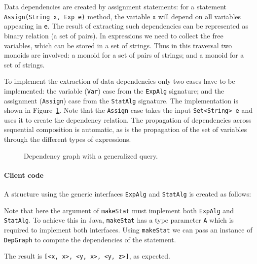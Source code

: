 
Data dependencies are created by assignment statements: for a
statement \lstinline{Assign(String x, Exp e)} method, the variable
\lstinline{x} will depend on all variables appearing in \lstinline{e}.
The result of extracting such dependencies can be represented as
binary relation (a set of pairs). In expressions we need to collect
the free variables, which can be stored in a set of strings.  Thus in
this traversal two monoids are involved: a monoid for a set of pairs
of strings; and a monoid for a set of strings.

To implement the extraction of data dependencies only two cases have to
be implemented: the variable (\lstinline{Var}) case from the
\lstinline{ExpAlg} signature; and the assignment (\lstinline{Assign})
case from the \lstinline{StatAlg} signature.  The implementation is
shown in Figure~\ref{deps2}.  Note that the \lstinline{Assign} case takes
the input \lstinline{Set<String> e} and uses it to create the
dependency relation.  The propagation of dependencies across
sequential composition is automatic, as is the propagation of the set
of variables through the different types of expressions.


\begin{figure}[t]
\nocaptionrule
\caption{Dependency graph with a generalized query.}
\label{deps2}
\end{figure}

\paragraph{Client code} A structure using the generic interfaces
\lstinline{ExpAlg} and \lstinline{StatAlg} is created as follows:


\noindent Note that here the argument of
\lstinline{makeStat} must
implement both \lstinline{ExpAlg} and \lstinline{StatAlg}. To achieve
this in Java, {\small\texttt{makeStat}} has a type parameter \lstinline{A}
which is required to implement both interfaces. Using
\lstinline{makeStat} we can pass an instance of
\lstinline{DepGraph} to compute the dependencies of the statement.


\noindent The result is \lstinline{[<x, x>, <y, x>, <y, z>]}, as expected.

